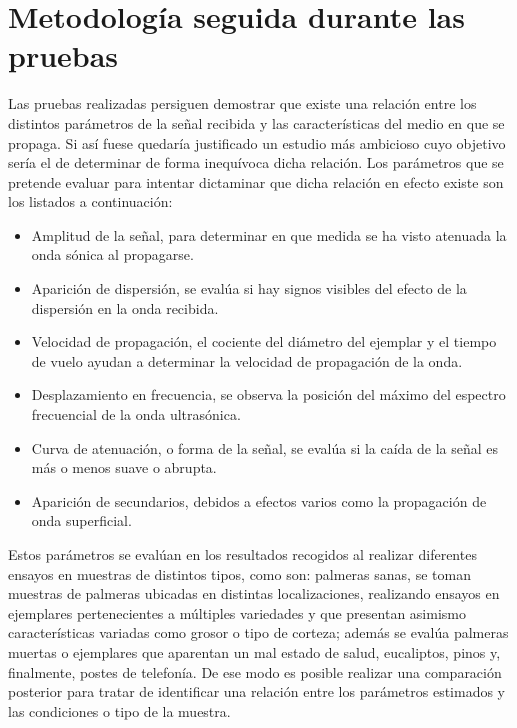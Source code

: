 \section{Metodología seguida durante las pruebas}

Las pruebas realizadas persiguen demostrar que existe una relación entre
los distintos parámetros de la señal recibida y las características del
medio en que se propaga. Si así fuese quedaría justificado un estudio más
ambicioso cuyo objetivo sería el de determinar de forma inequívoca dicha
relación. Los parámetros que se pretende evaluar para intentar dictaminar
que dicha relación en efecto existe son los listados a continuación:

\begin{itemize}
    \item Amplitud de la señal, para determinar en que medida se ha visto
	atenuada la onda sónica al propagarse.
    \item Aparición de dispersión, se evalúa si hay signos visibles del
	efecto de la dispersión en la onda recibida.
    \item Velocidad de propagación, el cociente del diámetro del ejemplar y
	el tiempo de vuelo ayudan a determinar la velocidad de propagación
	de la onda.
    \item Desplazamiento en frecuencia, se observa la posición del máximo
	del espectro frecuencial de la onda ultrasónica.
    \item Curva de atenuación, o forma de la señal, se evalúa si la caída
	de la señal es más o menos suave o abrupta.
    \item Aparición de secundarios, debidos a efectos varios como la
	propagación de onda superficial.
\end{itemize}

Estos parámetros se evalúan en los resultados recogidos al realizar
diferentes ensayos en muestras de distintos tipos, como son: palmeras
sanas, se toman muestras de palmeras ubicadas en distintas localizaciones,
realizando ensayos en ejemplares pertenecientes a múltiples variedades y
que presentan asimismo características variadas como grosor o tipo de
corteza; además se evalúa palmeras muertas o ejemplares que aparentan un
mal estado de salud, eucaliptos, pinos y, finalmente, postes de telefonía.
De ese modo es posible realizar una comparación posterior para tratar de
identificar una relación entre los parámetros estimados y las condiciones o
tipo de la muestra.

